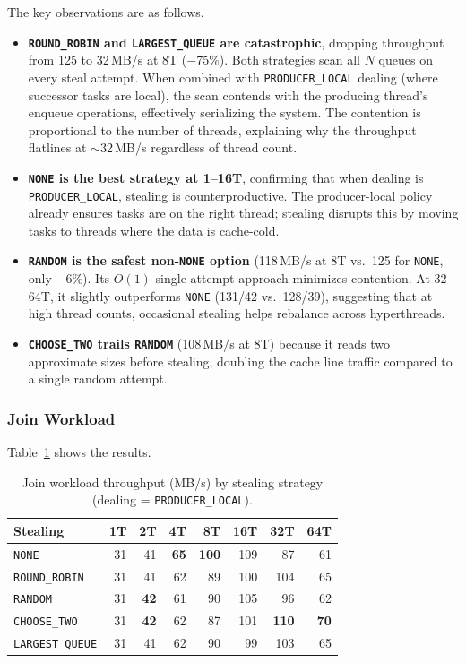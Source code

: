 The key observations are as follows.
%
\begin{itemize}
    \item \textbf{\texttt{ROUND\_ROBIN} and \texttt{LARGEST\_QUEUE} are catastrophic}, dropping throughput from 125 to 32\,MB/s at 8T ($-$75\%).
    Both strategies scan all $N$ queues on every steal attempt. When combined with \texttt{PRODUCER\_LOCAL} dealing (where successor tasks are local), the scan contends with the producing thread's enqueue operations, effectively serializing the system.
    The contention is proportional to the number of threads, explaining why the throughput flatlines at $\sim$32\,MB/s regardless of thread count.

    \item \textbf{\texttt{NONE} is the best strategy at 1--16T}, confirming that when dealing is \texttt{PRODUCER\_LOCAL}, stealing is counterproductive.
    The producer-local policy already ensures tasks are on the right thread; stealing disrupts this by moving tasks to threads where the data is cache-cold.

    \item \textbf{\texttt{RANDOM} is the safest non-\texttt{NONE} option} (118\,MB/s at 8T vs.\ 125 for \texttt{NONE}, only $-$6\%).
    Its $O(1)$ single-attempt approach minimizes contention.
    At 32--64T, it slightly outperforms \texttt{NONE} (131/42 vs.\ 128/39), suggesting that at high thread counts, occasional stealing helps rebalance across hyperthreads.

    \item \textbf{\texttt{CHOOSE\_TWO} trails \texttt{RANDOM}} (108\,MB/s at 8T) because it reads two approximate sizes before stealing, doubling the cache line traffic compared to a single random attempt.
\end{itemize}

\subsubsection{Join Workload}

Table~\ref{tab:ws-join} shows the results.

\begin{table}[h]
\centering
\caption{Join workload throughput (MB/s) by stealing strategy (dealing = \texttt{PRODUCER\_LOCAL}).}
\label{tab:ws-join}
\begin{tabular}{l|rrrrrrr}
\hline
\textbf{Stealing} & \textbf{1T} & \textbf{2T} & \textbf{4T} & \textbf{8T} & \textbf{16T} & \textbf{32T} & \textbf{64T} \\
\hline
\texttt{NONE}          & 31 & 41 & \textbf{65} & \textbf{100} & 109 & 87 & 61 \\
\texttt{ROUND\_ROBIN}  & 31 & 41 & 62 & 89 & 100 & 104 & 65 \\
\texttt{RANDOM}        & 31 & \textbf{42} & 61 & 90 & 105 & 96 & 62 \\
\texttt{CHOOSE\_TWO}   & 31 & \textbf{42} & 62 & 87 & 101 & \textbf{110} & \textbf{70} \\
\texttt{LARGEST\_QUEUE}& 31 & 41 & 62 & 90 & 99 & 103 & 65 \\
\hline
\end{tabular}
\end{table}

